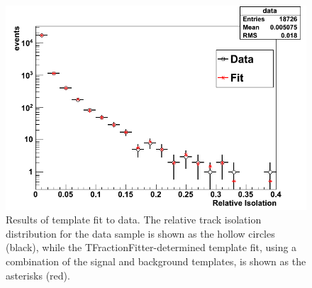  \begin{figure}[htb]
  \begin{center}
    \includegraphics[width=360pt]{Figures/TFractionFitter-full-01Mar11.png}
  \end{center}
  \caption[\fixspacing Results of template fit to data]{
    \fixspacing Results of template fit to data.
    The relative track isolation distribution 
    for the data sample 
    is shown as the hollow circles (black), 
    while the TFractionFitter-determined 
    template fit, 
    using a combination of the signal 
    and background templates, 
    is shown as the asterisks (red).  
  }
  \label{fig:TFractionFit}
 \end{figure}

